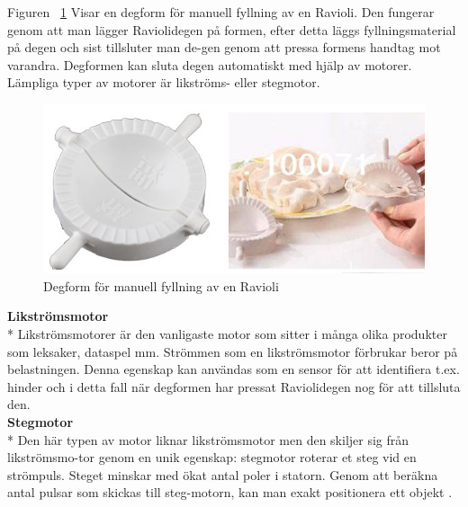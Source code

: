 Figuren ~\ref{degform} Visar en degform för manuell fyllning av en Ravioli. Den fungerar genom att man lägger Raviolidegen på formen, efter detta läggs fyllningsmaterial på degen och sist tillsluter man de-gen genom att pressa formens handtag mot varandra. Degformen kan sluta degen automatiskt med hjälp av motorer. Lämpliga typer av motorer  är likströms- eller stegmotor.
\begin{figure}[h]
	\begin{center}
		\includegraphics[scale=0.75]{images/ravioli_mould_trimed_1.jpg}
		\caption{Degform för manuell fyllning av en Ravioli}
		\label{degform}
	\end{center}
\end{figure}


\textbf{Likströmsmotor}\\*
Likströmsmotorer är den vanligaste motor som sitter i många olika produkter som leksaker, dataspel mm\cite{likstromsmotor}. Strömmen som en likströmsmotor förbrukar beror på belastningen. Denna egenskap kan användas som en sensor för att identifiera t.ex. hinder och i detta fall när degformen har pressat Raviolidegen nog för att tillsluta den.\\

\textbf{Stegmotor}\\*
Den här typen av motor liknar likströmsmotor men den skiljer sig från likströmsmo-tor genom en unik egenskap: stegmotor roterar et steg vid en strömpuls. Steget minskar med ökat antal poler i statorn. Genom att beräkna antal pulsar som skickas till steg-motorn, kan man exakt positionera ett objekt \cite{stegmotor}.
